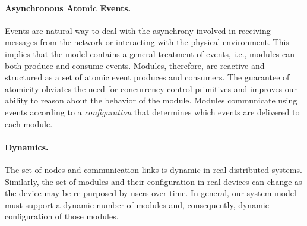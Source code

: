 \paragraph{Asynchronous Atomic Events.}
Events are natural way to deal with the asynchrony involved in receiving messages from the network or interacting with the physical environment.
This implies that the model contains a general treatment of events, i.e., modules can both produce and consume events.
Modules, therefore, are reactive and structured as a set of atomic event produces and consumers.
The guarantee of atomicity obviates the need for concurrency control primitives and improves our ability to reason about the behavior of the module.
Modules communicate using events according to a \emph{configuration} that determines which events are delivered to each module.


\paragraph{Dynamics.}
The set of nodes and communication links is dynamic in real distributed systems.
Similarly, the set of modules and their configuration in real devices can change as the device may be re-purposed by users over time.
In general, our system model must support a dynamic number of modules and, consequently, dynamic configuration of those modules.

